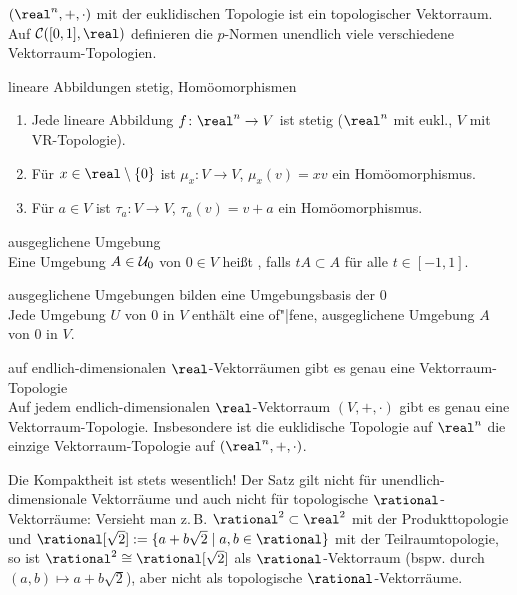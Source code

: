 \begin{Bsp}
    $(\real^n, +, \cdot)$ mit der euklidischen Topologie ist ein topologischer
    Vektorraum. \\
    Auf $\C([0, 1], \real)$ definieren die $p$-Normen unendlich viele
    verschiedene Vektorraum-Topologien.
\end{Bsp}

\begin{Satz}{lineare Abbildungen stetig, Homöomorphismen}
    \begin{enumerate}
        \item
        Jede lineare Abbildung $f\colon \real^n \rightarrow V$ ist stetig
        ($\real^n$ mit eukl., $V$ mit VR-Topologie).

        \item
        Für $x \in \real \setminus \{0\}$ ist $\mu_x\colon V \rightarrow V$,
        $\mu_x(v) = xv$ ein Homöomorphismus.

        \item
        Für $a \in V$ ist $\tau_a\colon V \rightarrow V$, $\tau_a(v) = v + a$
        ein Homöomorphismus.
    \end{enumerate}
\end{Satz}

\begin{Def}{ausgeglichene Umgebung}\\
    Eine Umgebung $A \in \mathcal{U}_0$ von $0 \in V$ heißt ,
    falls $tA \subset A$ für alle $t \in [-1, 1]$.
\end{Def}

\begin{Lemma}{ausgeglichene Umgebungen bilden eine Umgebungsbasis der $0$}\\
    Jede Umgebung $U$ von $0$ in $V$ enthält eine of"|fene,
    ausgeglichene Umgebung $A$ von $0$ in $V$.
\end{Lemma}

\begin{Satz}{auf endlich-dimensionalen $\real$-Vektorräumen gibt es genau
             eine Vektorraum-Topologie}\\
    Auf jedem endlich-dimensionalen $\real$-Vektorraum $(V, +, \cdot)$
    gibt es genau eine Vektorraum-Topo\-logie.
    Insbesondere ist die euklidische Topologie auf $\real^n$ die einzige
    Vektorraum-Topologie auf $(\real^n, +, \cdot)$.
\end{Satz}

\begin{Bem}
    Die Kompaktheit ist stets wesentlich!
    Der Satz gilt nicht für unendlich-dimensionale Vektorräume
    und auch nicht für topologische $\rational$-Vektorräume:
    Versieht man z.\,B. $\rational^2 \subset \real^2$ mit der Produkttopologie
    und $\rational[\sqrt{2}] := \{a + b\sqrt{2} \;|\; a, b \in \rational\}$
    mit der Teilraumtopologie, so ist $\rational^2 \cong \rational[\sqrt{2}]$
    als $\rational$-Vektorraum (bspw. durch $(a, b) \mapsto a + b \sqrt{2}$),
    aber nicht als topologische $\rational$-Vektorräume.
\end{Bem}

